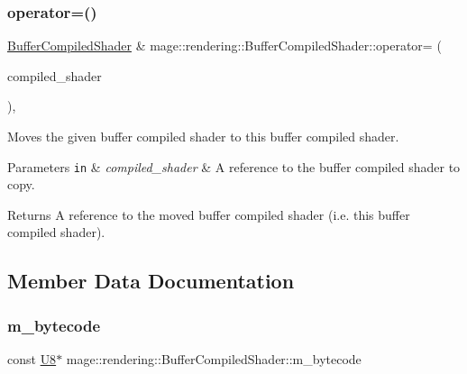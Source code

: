 \subsubsection{\texorpdfstring{operator=()}{operator=()}\hspace{0.1cm}{\footnotesize\ttfamily [2/2]}}
{\footnotesize\ttfamily \mbox{\hyperlink{classmage_1_1rendering_1_1_buffer_compiled_shader}{Buffer\+Compiled\+Shader}} \& mage\+::rendering\+::\+Buffer\+Compiled\+Shader\+::operator= (\begin{DoxyParamCaption}\item[{\mbox{\hyperlink{classmage_1_1rendering_1_1_buffer_compiled_shader}{Buffer\+Compiled\+Shader}} \&\&}]{compiled\+\_\+shader }\end{DoxyParamCaption})\hspace{0.3cm}{\ttfamily [default]}, {\ttfamily [noexcept]}}

Moves the given buffer compiled shader to this buffer compiled shader.


\begin{DoxyParams}[1]{Parameters}
\mbox{\tt in}  & {\em compiled\+\_\+shader} & A reference to the buffer compiled shader to copy. \\
\hline
\end{DoxyParams}
\begin{DoxyReturn}{Returns}
A reference to the moved buffer compiled shader (i.\+e. this buffer compiled shader). 
\end{DoxyReturn}


\subsection{Member Data Documentation}
\mbox{\label{classmage_1_1rendering_1_1_buffer_compiled_shader_a541d885c95b5430072f3da696194ec91}} 
\subsubsection{\texorpdfstring{m\+\_\+bytecode}{m\_bytecode}}
{\footnotesize\ttfamily const \mbox{\hyperlink{namespacemage_a30677c03d683c4c35630c25f6ff3fb7f}{U8}}$\ast$ mage\+::rendering\+::\+Buffer\+Compiled\+Shader\+::m\+\_\+bytecode\hspace{0.3cm}{\ttfamily [private]}}

